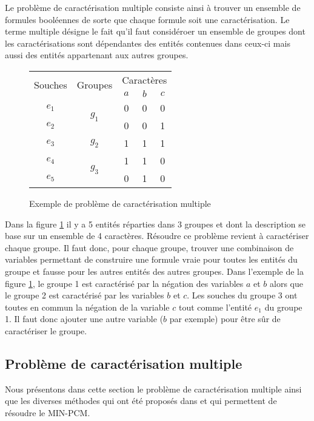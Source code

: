 Le problème de caractérisation multiple consiste ainsi à trouver un ensemble de
formules booléennes de sorte que chaque formule soit une caractérisation. Le terme
multiple désigne le fait qu'il faut considéroer un ensemble de groupes dont les
caractérisations sont dépendantes des entités contenues dans ceux-ci mais aussi
des entités appartenant aux autres groupes.

\begin{figure}[H]
\begin{center}
\begin{tabular}{|c||c|c|c|c|}
\hline
\multirow{2}{*}{Souches}&\multirow{2}{*}{Groupes}&\multicolumn{3}{c|}{Caractères
}\\
&&$a$&$b$&$c$\\
\hline
\hline
$e_1$&\multirow{2}{*}{$g_1$}&\cellcolor{lightgray}0&\cellcolor{lightgray}0&0\\
\cline{1-1} \cline{3-5}
$e_2$&&\cellcolor{lightgray}0& \cellcolor{lightgray}0&1\\
\hline
\hline
$e_3$&$g_2$&1&\cellcolor{lightgray}1&\cellcolor{lightgray}1\\
\hline
\hline
$e_4$&\multirow{2}{*}{$g_3$}&1&\cellcolor{lightgray}1&\cellcolor{lightgray}0\\
\cline{1-1} \cline{3-5}
$e_5$&&0&\cellcolor{lightgray}1&\cellcolor{lightgray}0\\
\hline
\end{tabular}
\end{center}
\caption{Exemple de problème de caractérisation multiple}
\label{CD}
\end{figure}

Dans la figure \ref{CD} il y a 5 entités réparties dans 3 groupes et dont
la description se base sur un ensemble de 4 caractères.
Résoudre ce problème revient à caractériser chaque groupe. Il faut donc, pour
chaque groupe, trouver une combinaison de  variables permettant de construire une formule vraie pour toutes les
entités du groupe et fausse pour les autres entités des autres
groupes. Dans l'exemple de la figure \ref{CD}, le groupe 1 est caractérisé par
la négation des variables $a$ et $b$  alors que le groupe 2 est caractérisé par
les variables $b$ et $c$. Les souches du groupe 3 ont toutes en commun la
négation de la variable $c$ tout comme l'entité $e_1$ du groupe 1. Il faut donc
ajouter une autre variable ($b$ par exemple) pour être sûr de caractériser le
groupe.
\subsection{Problème de caractérisation multiple}
Nous présentons dans cette section le problème de caractérisation multiple ainsi que les diverses méthodes qui ont été proposés dans \cite{Chhel2012,Chhel2013} et qui permettent de résoudre le MIN-PCM.

